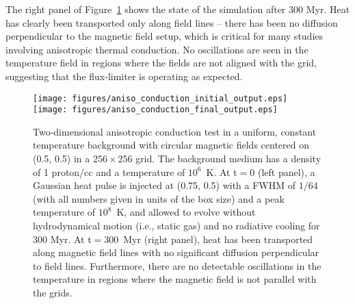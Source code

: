 The right panel of Figure~\ref{fig.conduct} shows the state of the
simulation after 300 Myr.  Heat has clearly been transported only along
field lines -- there has been no diffusion perpendicular to the
magnetic field setup, which is critical for many studies involving
anisotropic thermal conduction.  No oscillations are seen in the
temperature field in regions where the fields are not aligned with the
grid, suggesting that the flux-limiter is operating as expected.

\begin{figure}
\begin{center}
\texttt{[image: figures/aniso\_conduction\_initial\_output.eps]}
\texttt{[image: figures/aniso\_conduction\_final\_output.eps]}
\caption{Two-dimensional anisotropic conduction test in a uniform,
constant temperature background with circular magnetic fields centered
on (0.5, 0.5) in a $256 \times 256$ grid.  The background medium has a
density of 1 proton/cc and a temperature of $10^6$~K.  At t$ = 0$
(left panel), a Gaussian heat pulse is injected at (0.75, 0.5) with a
FWHM of $1/64$ (with all numbers given in units of the box size) and a
peak temperature of $10^8$~K, and allowed to evolve without
hydrodynamical motion (i.e., static gas) and no radiative cooling for
300 Myr.  At t$ = 300$~Myr (right panel), heat has been transported
along magnetic field lines with no significant diffusion perpendicular
to field lines. Furthermore, there are no detectable oscillations in
the temperature in regions where the magnetic field is not parallel
with the grids.}
\label{fig.conduct}
\end{center}
\end{figure}
